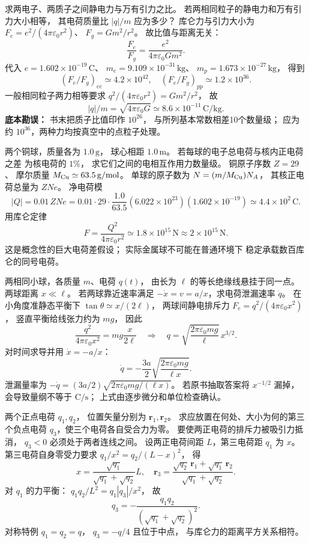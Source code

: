 求两电子、两质子之间静电力与万有引力之比。
若两相同粒子的静电力和万有引力大小相等，
其电荷质量比 $|q|/m$ 应为多少？
\exsolution
库仑力与引力大小为
$F_e=e^2/(4\pi\varepsilon_0r^2)$、
$F_g=Gm^2/r^2$。
故比值与距离无关：
\[
\frac{F_e}{F_g}=\frac{e^2}{4\pi\varepsilon_0 Gm^2}.
\]
代入 $e=1.602\times10^{-19}\,\mathrm C$、
$m_e=9.109\times10^{-31}\,\mathrm{kg}$、
$m_p=1.673\times10^{-27}\,\mathrm{kg}$，
得到
\[
\boxed{(F_e/F_g)_{ee}\simeq4.2\times10^{42}},\quad
\boxed{(F_e/F_g)_{pp}\simeq1.2\times10^{36}}.
\]
一般相同粒子两力相等要求
$q^2/(4\pi\varepsilon_0r^2)=Gm^2/r^2$，
故
\[
\boxed{|q|/m=\sqrt{4\pi\varepsilon_0G}
\simeq8.6\times10^{-11}\,\mathrm{C/kg}}.
\]
\excheck \textbf{底本勘误：}
书末把质子比值印作 $10^{26}$，
与所列基本常数相差10个数量级；
应为约 $10^{36}$，两种力均按真空中的点粒子处理。

两个铜球，质量各为 $1.0\,\mathrm g$，
球心相距 $1.0\,\mathrm m$。
若每球的电子总电荷与核内正电荷之差
为核电荷的 $1\%$，
求它们之间的电相互作用力数量级。
\exsolution
铜原子序数 $Z=29$、
摩尔质量 $M_{\rm Cu}\simeq63.5\,\mathrm{g/mol}$。
单球的原子数为
$N=(m/M_{\rm Cu})N_A$，
其核正电荷总量为 $ZNe$。
净电荷模
\[
|Q|=0.01\,ZNe
=0.01\cdot29\cdot\frac{1.0}{63.5}
(6.022\times10^{23})(1.602\times10^{-19})
\simeq4.4\times10^2\,\mathrm C.
\]
用库仑定律
\[
\boxed{F=\frac{Q^2}{4\pi\varepsilon_0r^2}
\simeq1.8\times10^{15}\,\mathrm N
\approx2\times10^{15}\,\mathrm N}.
\]
\excheck 这是概念性的巨大电荷差假设；
实际金属球不可能在普通环境下
稳定承载数百库仑的同号电荷。

两相同小球，各质量 $m$、电荷 $q(t)$，
由长为 $\ell$ 的等长绝缘线悬挂于同一点。
两球距离 $x\ll\ell$。
若两球靠近速率满足
$-\dot x=v=a/x$，求电荷泄漏速率 $\dot q$。
\exsolution
在小角度准静态平衡下
$\tan\theta\simeq x/(2\ell)$，
两球间静电排斥力
$F_e=q^2/(4\pi\varepsilon_0x^2)$，
竖直平衡给线张力约为 $mg$，
因此
\[
\frac{q^2}{4\pi\varepsilon_0x^2}
=mg\frac{x}{2\ell}
\quad\Longrightarrow\quad
q=\sqrt{\frac{2\pi\varepsilon_0mg}{\ell}}\,
x^{3/2}.
\]
对时间求导并用 $\dot x=-a/x$：
\[
\boxed{\dot q=
-\frac{3a}{2}
\sqrt{\frac{2\pi\varepsilon_0mg}{\ell x}}}.
\]
泄漏量率为
$-\dot q=(3a/2)\sqrt{2\pi\varepsilon_0mg/(\ell x)}$。
\excheck 若原书抽取答案将 $x^{-1/2}$ 漏掉，
会导致量纲不等于 $\mathrm{C/s}$；
上式由逐步微分和单位检查确认。

两个正点电荷 $q_1,q_2$，
位置矢量分别为 $\bm r_1,\bm r_2$。
求应放置在何处、大小为何的第三个负点电荷
$q_3$，使三个电荷各自受合力为零。
\exsolution
要使两正电荷的排斥力被吸引力抵消，
$q_3<0$ 必须处于两者连线之间。
设两正电荷间距 $L$，第三电荷距 $q_1$ 为 $x$。
第三电荷自身零受力要求
$q_1/x^2=q_2/(L-x)^2$，
得
\[
x=\frac{\sqrt{q_1}}{\sqrt{q_1}+\sqrt{q_2}}L,
\quad
\boxed{\bm r_3=
\frac{\sqrt{q_2}\,\bm r_1+\sqrt{q_1}\,\bm r_2}
{\sqrt{q_1}+\sqrt{q_2}}}.
\]
对 $q_1$ 的力平衡：
$q_1q_2/L^2=q_1|q_3|/x^2$，
故
\[
\boxed{q_3=-\frac{q_1q_2}
{(\sqrt{q_1}+\sqrt{q_2})^2}}.
\]
\excheck 对称特例 $q_1=q_2=q$，
$q_3=-q/4$ 且位于中点，
与库仑力的距离平方关系相符。

